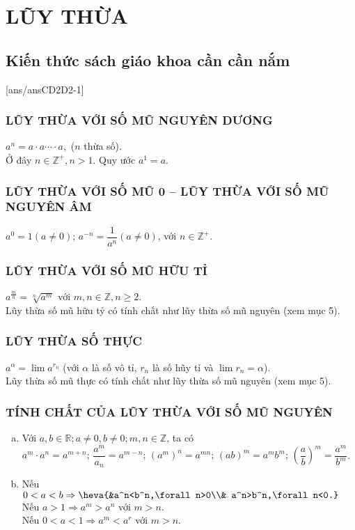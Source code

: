\setcounter{chapter}{1}%
\section{LŨY THỪA}
\subsection{Kiến thức sách giáo khoa cần cần nắm}
[ans/ansCD2D2-1]
\subsubsection{LŨY THỪA VỚI SỐ MŨ NGUYÊN DƯƠNG}
\hspace*{5cm} $a^n=a\cdot a\cdots\cdot a,$ ($n$ thừa số).\\
Ở đây $n\in\mathbb{Z}^+, n>1$. Quy ước $a^1=a$.
\subsubsection{LŨY THỪA VỚI SỐ MŨ 0 – LŨY THỪA VỚI SỐ MŨ NGUYÊN ÂM}
\hspace*{5cm} $a^{0}=1(a\neq 0)$; $a^{-n}=\dfrac{1}{a^n}(a\neq 0)$, với $n\in\mathbb{Z}^+$.
\subsubsection{LŨY THỪA VỚI SỐ MŨ HỮU TỈ}
\hspace*{5cm} $a^{\tfrac{m}{n}}=\sqrt[n]{a^m} $ với $m,n \in \mathbb{Z}, n \geq 2.$\\
Lũy thừa số mũ hữu tỷ có tính chất như lũy thừa số mũ nguyên (xem mục 5).
\subsubsection{LŨY THỪA SỐ THỰC}
\hspace*{5cm}  $a^{\alpha}=\lim a^{r_n}$ (với $\alpha$ là số vô tỉ, $r_n$ là số hũy tỉ và $\lim r_n=\alpha$).\\
Lũy thừa số mũ thực có tính chất như lũy thừa số mũ nguyên (xem mục 5).
\subsubsection{TÍNH CHẤT CỦA LŨY THỪA VỚI SỐ MŨ NGUYÊN}
\begin{enumerate}[a)]
	\item Với $a,b \in \mathbb{R};a \neq 0,b \neq 0;m,n \in \mathbb{Z} $, ta có\\
	$a^m\cdot a^n=a^{m+n};\,\dfrac{a^m}{a_n}=a^{m-n};\,\left(a^m\right)^n=a^{mn};\,(ab)^m=a^mb^m;\,\left(\dfrac{a}{b}\right)^m=\dfrac{a^m}{b^m} $.
	\item Nếu $0<a<b \Rightarrow \heva{&a^n<b^n,\forall n>0\\& a^n>b^n,\forall n<0.} $\\
	Nếu $a>1\Rightarrow a^m>a^n$ với $m>n$.\\
	Nếu $0<a<1 \Rightarrow a^m<a^{r} $ với  $m>n$.
\end{enumerate}
